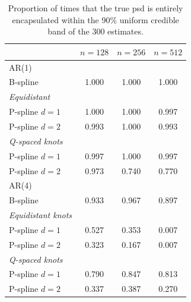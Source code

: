 \documentclass[twocolumn,final]{svjour3}
\begin{document}
\begin{table}
	\centering
		\begin{tabular}{lccc}
			\toprule
			& $n=128$ & $n=256$ & $n=512$ \\ \hline
			AR(1)     &  &  &  \\ 
			B-spline &  1.000 & 1.000 & 1.000 \\
			\textit{Equidistant}& & &   \\
			\hspace{0.5em}P-spline $d=1$&  1.000 & 1.000 & 0.997\\
			\hspace{0.5em}P-spline $d=2$& 0.993 & 1.000 & 0.993  \\
			\textit{Q-spaced knots}& & &   \\
			\hspace{0.5em}P-spline $d=1$ & 0.997 & 1.000 & 0.997 \\
			\hspace{0.5em}P-spline $d=2$ & 0.973 & 0.740 & 0.770 \\ \hline		       
			AR(4)     &  &  &  \\ 
			B-spline &  0.933 & 0.967 & 0.897  \\
			\textit{Equidistant knots}& & &   \\
			\hspace{0.5em}P-spline $d=1$ &  0.527 & 0.353 & 0.007 \\
			\hspace{0.5em}P-spline $d=2$ & 0.323 & 0.167 & 0.007\\
			\textit{Q-spaced knots}& & &   \\	
			\hspace{0.5em}P-spline $d=1$ & 0.790 & 0.847 & 0.813 \\
			\hspace{0.5em}P-spline $d=2$ & 0.337 & 0.387 & 0.270 \\
			\bottomrule
		\end{tabular}
	\caption{Proportion of times that the true psd is entirely encapsulated within the 90\% uniform credible band of the 300 estimates.}
	\label{table:sim_covPbb}
\end{table}
\end{document}
